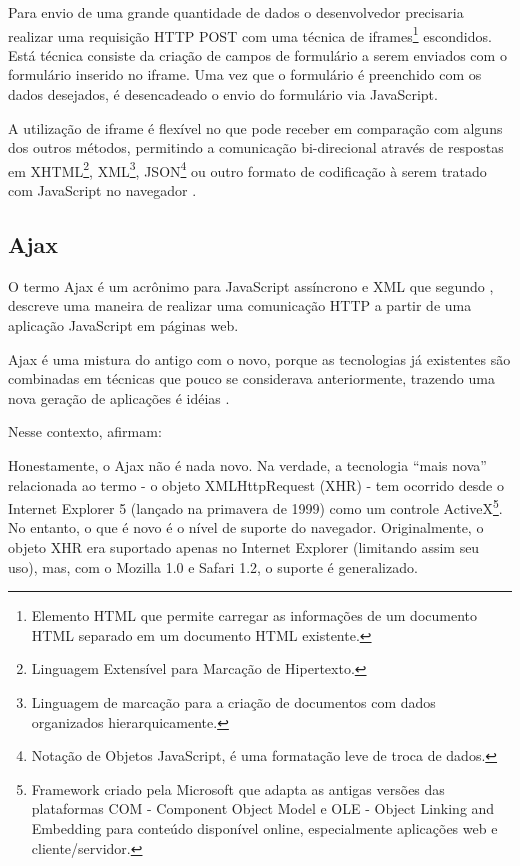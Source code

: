 Para envio de uma grande quantidade de dados o desenvolvedor precisaria realizar uma requisição HTTP POST com uma técnica de iframes\footnote{Elemento HTML que permite carregar as informações de um documento HTML separado em um documento HTML existente.} escondidos. Está técnica consiste da criação de campos de formulário a serem enviados com o formulário inserido no iframe. Uma vez que o formulário é preenchido com os dados desejados, é desencadeado o envio do formulário via JavaScript.

A utilização de iframe é flexível no que pode receber em comparação com alguns dos outros métodos, permitindo a comunicação bi-direcional através de respostas em XHTML\footnote{Linguagem Extensível para Marcação de Hipertexto.}, XML\footnote{Linguagem de marcação para a criação de documentos com dados organizados hierarquicamente.}, JSON\footnote{Notação de Objetos JavaScript, é uma formatação leve de troca de dados.} ou outro formato de codificação à serem tratado com JavaScript no navegador \cite{powell2008ajax}.

\subsection{Ajax}

O termo Ajax é um acrônimo para JavaScript assíncrono e XML que segundo , descreve uma maneira de realizar uma comunicação HTTP a partir de uma aplicação JavaScript em páginas web.

Ajax é uma mistura do antigo com o novo, porque as tecnologias já existentes são combinadas em técnicas que pouco se considerava anteriormente, trazendo uma nova geração de aplicações é idéias \cite{gross2006introduction}.

Nesse contexto,  afirmam:
\begin{citacao}
	Honestamente, o Ajax não é nada novo. Na verdade, a tecnologia “mais nova” relacionada ao termo - o objeto XMLHttpRequest (XHR) - tem ocorrido desde o Internet Explorer 5 (lançado na primavera de 1999) como um controle ActiveX\footnote{Framework criado pela Microsoft que adapta as antigas versões das plataformas COM - Component Object Model e OLE - Object Linking and Embedding para conteúdo disponível online, especialmente aplicações web e cliente/servidor.}. No entanto, o que é novo é o nível de suporte do navegador. Originalmente, o objeto XHR era suportado apenas no Internet Explorer (limitando assim seu uso), mas, com o Mozilla 1.0 e Safari 1.2, o suporte é generalizado.
\end{citacao}

